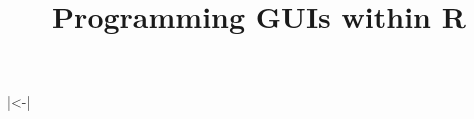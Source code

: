 \newcommand{\iprogram}[1]{\index{Programming concepts!#1}}
\newcommand{\ilayout}[1]{\index{Layout!#1}}


\newcommand{\tagger}[1]{\texttt{#1}}
\newcommand{\tagattr}[2]{\texttt{#1}} %

\usepackage{fancyvrb}
\DefineShortVerb{\|}
|<-|
\newcommand{\leftBracket}{$<$}
\newcommand{\rightBracket}{$>$}
\newcommand{\ASSIGN}{\code{\textless-}}  %
\newcommand{\backslashn}{\code{$\backslash$n}} %

\newcommand{\GTK}{GTK+}
\newcommand{\TCL}{Tcl}
\newcommand{\Tcl}{\TCL}
\newcommand{\TK}{Tk}
\newcommand{\Tk}{Tk}
\newcommand{\tcltk}{Tcl/Tk}
\newcommand{\Qt}{Qt}
\newcommand{\wxWidgets}{wxWidgets}
\newcommand{\Java}{Java}
\newcommand{\gWidgets}{gWidgets}

\newcommand{\TITLE}{Programming GUIs within R}
\title{\TITLE}
\newcommand{\PACKAGENAME}{ProgGUIInR}
\newcommand{\WINDOZE}{Windows}
\newcommand{\UNIX}{Unix}
\newcommand{\LINUX}{Linux}
\newcommand{\OSX}{Mac OS X}



\usepackage{color}




\usepackage{fancyvrb}
\usepackage{multicol}          %

\usepackage{prelim2e}           %
\renewcommand{\PrelimWords}{Draft version, do not circulate}


\usepackage{lscape}             %


